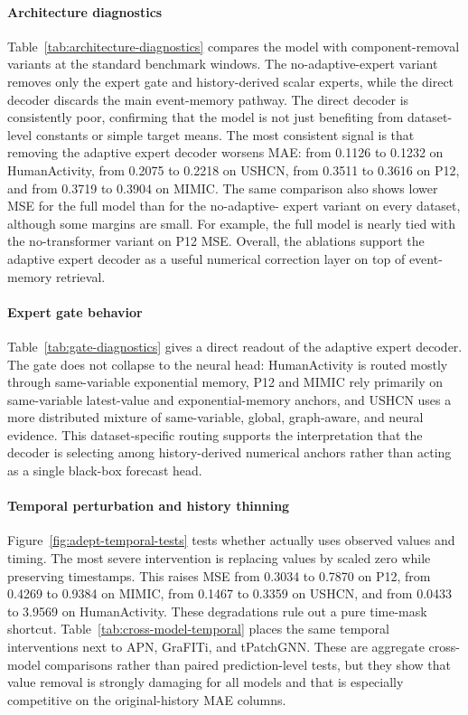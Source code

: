 \documentclass[preprint,12pt]{elsarticle}
\begin{document}
\paragraph{Architecture diagnostics}
Table~\ref{tab:architecture-diagnostics} compares the \method{} model
with component-removal variants at the standard benchmark windows. The
no-adaptive-expert variant removes only the expert gate and history-derived
scalar experts, while the direct decoder discards the main event-memory
pathway. The direct decoder is consistently poor, confirming that the model is
not just benefiting from dataset-level constants or simple target means. The most consistent signal is that removing the adaptive expert decoder worsens
MAE: from 0.1126 to 0.1232 on HumanActivity, from 0.2075 to 0.2218 on USHCN,
from 0.3511 to 0.3616 on P12, and from 0.3719 to 0.3904 on MIMIC. The same
comparison also shows lower MSE for the full model than for the no-adaptive-
expert variant on every dataset, although some margins are small. For example,
the full model is nearly tied with the no-transformer variant on P12 MSE.
Overall, the ablations support the adaptive expert decoder as a useful
numerical correction layer on top of event-memory retrieval.

\paragraph{Expert gate behavior}
Table~\ref{tab:gate-diagnostics} gives a direct readout of the adaptive expert
decoder. The gate does not collapse to the neural head: HumanActivity is routed
mostly through same-variable exponential memory, P12 and MIMIC rely primarily
on same-variable latest-value and exponential-memory anchors, and USHCN uses a
more distributed mixture of same-variable, global, graph-aware, and neural
evidence. This dataset-specific routing supports the interpretation that the
decoder is selecting among history-derived numerical anchors rather than acting
as a single black-box forecast head.

\paragraph{Temporal perturbation and history thinning}
Figure~\ref{fig:adept-temporal-tests} tests whether \method{} actually uses
observed values and timing. The most severe intervention is replacing values by
scaled zero while preserving timestamps. This raises MSE from 0.3034 to 0.7870
on P12, from 0.4269 to 0.9384 on MIMIC, from 0.1467 to 0.3359 on USHCN, and
from 0.0433 to 3.9569 on HumanActivity. These degradations rule out a pure
time-mask shortcut.
Table~\ref{tab:cross-model-temporal} places the same temporal interventions
next to APN, GraFITi, and tPatchGNN. These are aggregate cross-model
comparisons rather than paired prediction-level tests, but they show that value
removal is strongly damaging for all models and that \method{} is especially
competitive on the original-history MAE columns.
\end{document}
